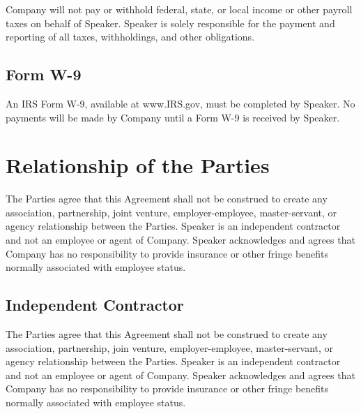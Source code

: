 \documentclass[a4paper,12pt]{article} %
\begin{document}
Company will not pay or withhold federal, state, or local income or other payroll taxes on behalf of Speaker. Speaker is solely responsible for the payment and reporting of all taxes, withholdings, and other obligations.

\subsection{Form W-9}

An IRS Form W-9, available at www.IRS.gov, must be completed by Speaker. No payments will be made by Company until a Form W-9 is received by Speaker.


\section{Relationship of the Parties}

The Parties agree that this Agreement shall not be construed to create any association, partnership, joint venture, employer-employee, master-servant, or agency relationship between the Parties. Speaker is an independent contractor and not an employee or agent of Company. Speaker acknowledges and agrees that Company has no responsibility to provide insurance or other fringe benefits normally associated with employee status.

\subsection{Independent Contractor}

The Parties agree that this Agreement shall not be construed to create any association, partnership, join venture, employer-employee, master-servant, or agency relationship between the Parties. Speaker is an independent contractor and not an employee or agent of Company. Speaker acknowledges and agrees that Company has no responsibility to provide insurance or other fringe benefits normally associated with employee status.


\end{document}

